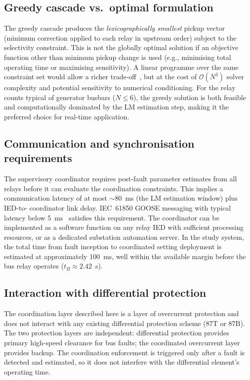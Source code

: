 \documentclass[journal,twoside,letterpaper]{IEEEtran}
\begin{document}
\subsection{Greedy cascade vs.\ optimal formulation}

The greedy cascade produces the \emph{lexicographically
smallest} pickup vector (minimum correction applied to
each relay in upstream order) subject to the
selectivity constraint.
This is not the globally optimal solution if an
objective function other than minimum pickup change is
used (e.g., minimising total operating time or maximising
sensitivity).
A linear programme over the same constraint set would
allow a richer trade-off~\cite{Urdaneta1988}, but at
the cost of $\mathcal{O}(N^3)$ solver complexity and
potential sensitivity to numerical conditioning.
For the relay counts typical of generator busbars
($N \leq 6$), the greedy solution is both feasible and
computationally dominated by the LM estimation step,
making it the preferred choice for real-time application.

\subsection{Communication and synchronisation requirements}

The supervisory coordinator requires post-fault
parameter estimates from all relays before it can
evaluate the coordination constraints.
This implies a communication latency of at most
$\sim$80~ms (the LM estimation window) plus IED-to-
coordinator link delay.
IEC~61850 GOOSE messaging with typical latency below
5~ms~\cite{IEC61850_2013} satisfies this requirement.
The coordinator can be implemented as a
software function on any relay IED with sufficient
processing resources, or as a dedicated substation
automation server.
In the study system, the total time from fault inception
to coordinated setting deployment is estimated at
approximately 100~ms, well within the available
margin before the bus relay operates
($t_B \approx 2.42$~s).

\subsection{Interaction with differential protection}

The coordination layer described here is a layer of
overcurrent protection and does not interact with any
existing differential protection scheme ($87\mathrm{T}$
or $87\mathrm{B}$).
The two protection layers are independent:
differential protection provides primary high-speed
clearance for bus faults; the coordinated overcurrent
layer provides backup.
The coordination enforcement is triggered only after
a fault is detected and estimated, so it does not
interfere with the differential element's operating time.
\end{document}
